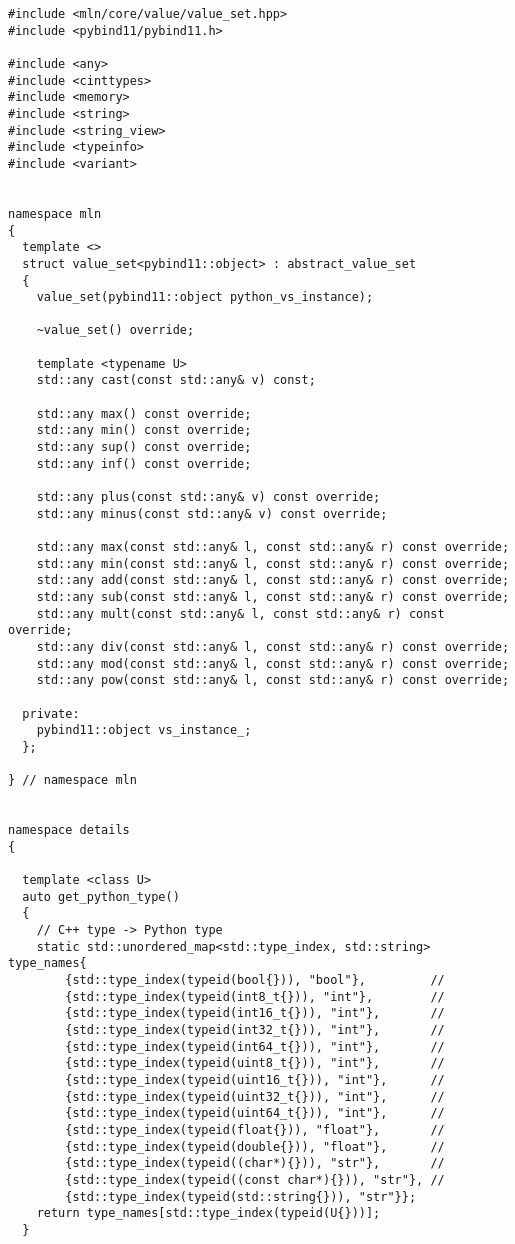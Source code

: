 \begin{verbatim}
#include <mln/core/value/value_set.hpp>
#include <pybind11/pybind11.h>

#include <any>
#include <cinttypes>
#include <memory>
#include <string>
#include <string_view>
#include <typeinfo>
#include <variant>


namespace mln
{
  template <>
  struct value_set<pybind11::object> : abstract_value_set
  {
    value_set(pybind11::object python_vs_instance);

    ~value_set() override;

    template <typename U>
    std::any cast(const std::any& v) const;

    std::any max() const override;
    std::any min() const override;
    std::any sup() const override;
    std::any inf() const override;

    std::any plus(const std::any& v) const override;
    std::any minus(const std::any& v) const override;

    std::any max(const std::any& l, const std::any& r) const override;
    std::any min(const std::any& l, const std::any& r) const override;
    std::any add(const std::any& l, const std::any& r) const override;
    std::any sub(const std::any& l, const std::any& r) const override;
    std::any mult(const std::any& l, const std::any& r) const override;
    std::any div(const std::any& l, const std::any& r) const override;
    std::any mod(const std::any& l, const std::any& r) const override;
    std::any pow(const std::any& l, const std::any& r) const override;

  private:
    pybind11::object vs_instance_;
  };

} // namespace mln


namespace details
{

  template <class U>
  auto get_python_type()
  {
    // C++ type -> Python type
    static std::unordered_map<std::type_index, std::string> type_names{
        {std::type_index(typeid(bool{})), "bool"},         //
        {std::type_index(typeid(int8_t{})), "int"},        //
        {std::type_index(typeid(int16_t{})), "int"},       //
        {std::type_index(typeid(int32_t{})), "int"},       //
        {std::type_index(typeid(int64_t{})), "int"},       //
        {std::type_index(typeid(uint8_t{})), "int"},       //
        {std::type_index(typeid(uint16_t{})), "int"},      //
        {std::type_index(typeid(uint32_t{})), "int"},      //
        {std::type_index(typeid(uint64_t{})), "int"},      //
        {std::type_index(typeid(float{})), "float"},       //
        {std::type_index(typeid(double{})), "float"},      //
        {std::type_index(typeid((char*){})), "str"},       //
        {std::type_index(typeid((const char*){})), "str"}, //
        {std::type_index(typeid(std::string{})), "str"}};
    return type_names[std::type_index(typeid(U{}))];
  }


\end{verbatim}
